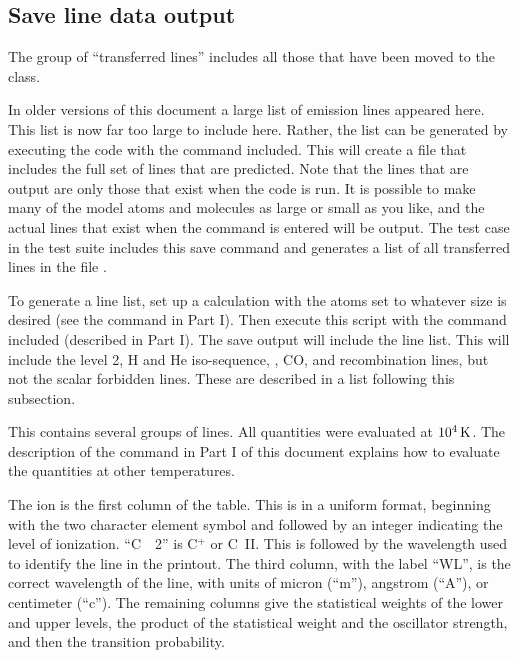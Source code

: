 \subsection{Save line data output}

The group of ``transferred lines'' includes all those that have been
moved to the  class.

In older versions of this document a large list of emission lines
appeared here.
This list is now far too large to include here.
Rather,
the list can be generated by executing the code with the command  included.
This will create a file that includes the
full set of lines that are predicted.
Note that the lines that are output
are only those that exist when the code is run.
It is possible to make
many of the model atoms and molecules as large or small as you like,
and
the actual lines that exist when the  command
is entered will be output.
The test case  in the test suite
includes this save command and generates a list of all transferred
lines in the file .

To generate a line list, set up a calculation with the atoms set to
whatever size is desired (see the  command in Part I).  Then execute
this script with the  command included (described in Part I).
The save output will include the line list.
This will include the level 2, H and He iso-sequence,
\htwo, CO, and recombination lines,
but not the scalar forbidden lines.
These are described in a list following this subsection.

This contains several groups of lines.
All quantities were evaluated at $10^4 {\rm\thinspace K}$.
The description of the command in Part I of this document explains
how to evaluate the quantities at other temperatures.

The ion is the first column of the table.
This is in a uniform format,
beginning with the two character element symbol and followed by an integer
indicating the level of ionization.
``C~~2'' is C$^+$ or C~II.
This is
followed by the wavelength used to identify the line in the
printout.
The third column, with the label ``WL'', is the correct wavelength
of the line, with units of micron (``m''), angstrom (``A''),
or centimeter (``c'').
The remaining columns give the statistical weights of the lower and upper
levels, the product of the statistical weight and the oscillator strength,
and then the transition probability.

